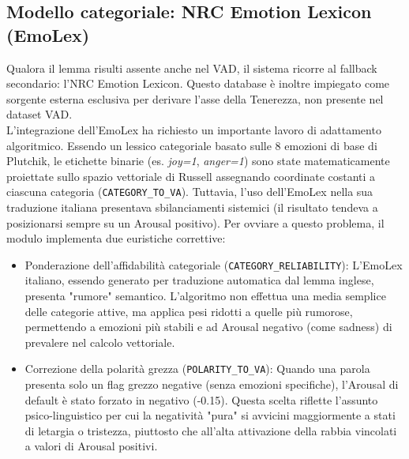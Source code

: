 \subsection{Modello categoriale: NRC Emotion Lexicon (EmoLex)}       
Qualora il lemma risulti assente anche nel VAD, il sistema ricorre al fallback secondario: l'NRC Emotion Lexicon. Questo database è inoltre impiegato 
come sorgente esterna esclusiva per derivare l'asse della Tenerezza, non presente nel dataset VAD.\\
L'integrazione dell'EmoLex ha richiesto un importante lavoro di adattamento algoritmico. Essendo un lessico categoriale basato sulle 8 emozioni di base 
di Plutchik, le etichette binarie (es. \textit{joy=1}, \textit{anger=1}) sono state matematicamente proiettate sullo spazio vettoriale di Russell 
assegnando coordinate costanti a ciascuna categoria (\texttt{CATEGORY\_TO\_VA}). Tuttavia, l'uso dell'EmoLex nella sua traduzione italiana presentava 
sbilanciamenti sistemici (il risultato tendeva a posizionarsi sempre su un Arousal positivo). Per ovviare a questo problema, il modulo implementa 
due euristiche correttive:
\begin{itemize}
    \item Ponderazione dell'affidabilità categoriale (\texttt{CATEGORY\_RELIABILITY}): L'EmoLex italiano, essendo generato per traduzione automatica dal lemma inglese, 
    presenta "rumore" semantico. L'algoritmo non effettua una media semplice delle categorie attive, ma applica pesi ridotti a quelle più rumorose, 
    permettendo a emozioni più stabili e ad Arousal negativo (come sadness) di prevalere nel calcolo vettoriale.
    \item Correzione della polarità grezza (\texttt{POLARITY\_TO\_VA}): Quando una parola presenta solo un flag grezzo negative (senza emozioni specifiche), 
    l'Arousal di default è stato forzato in negativo (-0.15). Questa scelta riflette l'assunto psico-linguistico per cui la negatività "pura" 
    si avvicini maggiormente a stati di letargia o tristezza, piuttosto che all'alta attivazione della rabbia vincolati a  valori di Arousal positivi.
\end{itemize}

